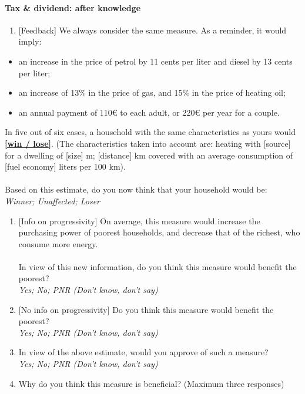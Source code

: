 \documentclass[12pt]{article} %
\begin{document}
\begin{appendices}
\paragraph{Tax \& dividend: after knowledge}
\begin{enumerate}[resume,leftmargin=*]
\item {[}Feedback{]} We always consider the same measure. As a reminder,
it would imply: 
\end{enumerate}
\begin{itemize}
\item an increase in the price of petrol by 11 cents per liter and diesel
by 13 cents per liter; 
\item an increase of 13\% in the price of gas, and 15\% in the price of
heating oil; 
\item an annual payment of 110\euro{} to each adult, or 220\euro{} per year for a couple. 
\end{itemize}
In five out of six cases, a household with the same characteristics
as yours would \textbf{\underline{{[}win / lose{]}}}. (The characteristics
taken into account are: heating with {[}source{]} for a dwelling of
{[}size{]} m\texttwosuperior ; {[}distance{]} km covered with an average
consumption of {[}fuel economy{]} liters per 100 km). \\
\\
Based on this estimate, do you now think that your household would
be: \emph{}\\
\emph{Winner; Unaffected; Loser} 
\begin{enumerate}[resume,leftmargin=*]
\item {[}Info on progressivity{]} On average, this measure would increase
the purchasing power of poorest households, and decrease that of the
richest, who consume more energy. \\
\\
In view of this new information, do you think this measure would benefit
the poorest? \emph{}\\
\emph{Yes; No; PNR (Don't know, don't say)}
\item {[}No info on progressivity{]} Do you think this measure would benefit
the poorest?\\
\emph{Yes; No; PNR (Don't know, don't say)}
\item In view of the above estimate, would you approve of such a measure?
\emph{}\\
\emph{Yes; No; PNR (Don't know, don't say)} 
\item Why do you think this measure is beneficial? (Maximum three responses)

\end{enumerate}
\end{appendices}
\end{document}

